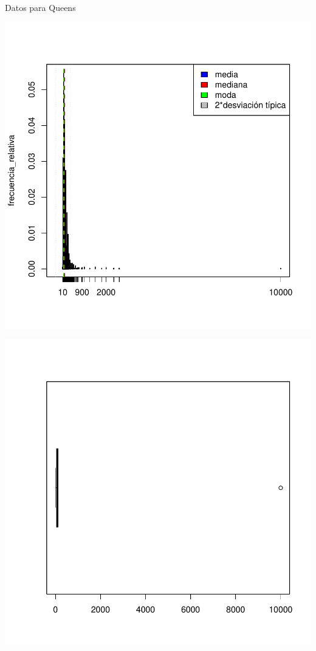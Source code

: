 \documentclass [a4paper] {article}
\begin{document}
Datos para Queens
\begin{center}
\includegraphics{entrega-041}
\end{center}
\begin{center}
\includegraphics{entrega-042}
\end{center}
\end{document}
